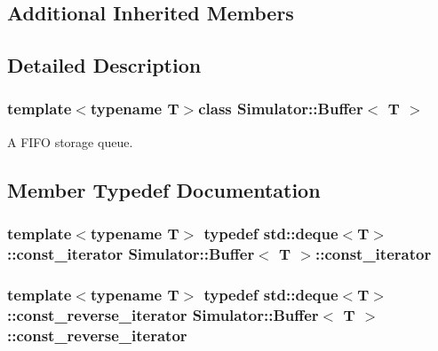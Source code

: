\subsection*{Additional Inherited Members}


\subsection{Detailed Description}
\subsubsection*{template$<$typename T$>$class Simulator\+::\+Buffer$<$ T $>$}

A F\+I\+F\+O storage queue. 

\subsection{Member Typedef Documentation}
\hypertarget{class_simulator_1_1_buffer_a50ac4b556b0c93ce985359e10472923b}{
\subsubsection[{const\+\_\+iterator}]{\setlength{\rightskip}{0pt plus 5cm}template$<$typename T$>$ typedef std\+::deque$<$T$>$\+::{\bf const\+\_\+iterator} {\bf Simulator\+::\+Buffer}$<$ T $>$\+::{\bf const\+\_\+iterator}}}\label{class_simulator_1_1_buffer_a50ac4b556b0c93ce985359e10472923b}
\hypertarget{class_simulator_1_1_buffer_aed79765ab3f5ebbcf7399c9402634607}{
\subsubsection[{const\+\_\+reverse\+\_\+iterator}]{\setlength{\rightskip}{0pt plus 5cm}template$<$typename T$>$ typedef std\+::deque$<$T$>$\+::{\bf const\+\_\+reverse\+\_\+iterator} {\bf Simulator\+::\+Buffer}$<$ T $>$\+::{\bf const\+\_\+reverse\+\_\+iterator}}}\label{class_simulator_1_1_buffer_aed79765ab3f5ebbcf7399c9402634607}


